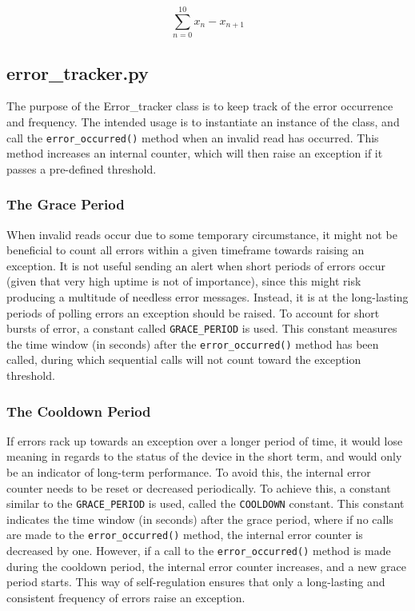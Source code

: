 $$\sum_{n=0}^{10} x_n - x_{n+1}$$


\subsection{error\_tracker.py}
The purpose of the Error\_tracker class is to keep track of the error occurrence and frequency. The intended usage is to instantiate an instance of the class, and call the \lstinline{error_occurred()} method when an invalid read has occurred. This method increases an internal counter, which will then raise an exception if it passes a pre-defined threshold.

\subsubsection{The Grace Period}
When invalid reads occur due to some temporary circumstance, it might not be beneficial to count all errors within a given timeframe towards raising an exception. It is not useful sending an alert when short periods of errors occur (given that very high uptime is not of importance), since this might risk producing a multitude of needless error messages. Instead, it is at the long-lasting periods of polling errors an exception should be raised. To account for short bursts of error, a constant called \lstinline{GRACE_PERIOD} is used. This constant measures the time window (in seconds) after the \lstinline{error_occurred()} method has been called, during which sequential calls  will not count toward the exception threshold.

\subsubsection{The Cooldown Period}
If errors rack up towards an exception over a longer period of time, it would lose meaning in regards to the status of the device in the short term, and would only be an indicator of long-term performance. To avoid this, the internal error counter needs to be reset or decreased periodically. To achieve this, a constant similar to the \lstinline{GRACE_PERIOD} is used, called the \lstinline{COOLDOWN} constant. This constant indicates the time window (in seconds) after the grace period, where if no calls are made to the \lstinline{error_occurred()} method, the internal error counter is decreased by one. However, if a call to the \lstinline{error_occurred()} method is made during the cooldown period, the internal error counter increases, and a new grace period starts. This way of self-regulation ensures that only a long-lasting and consistent frequency of errors raise an exception.


